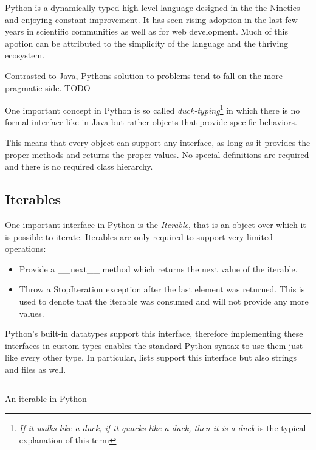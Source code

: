 \documentclass[parskip=half]{scrreprt}
\newcommand\inline[1]{{\addfontfeature{Letters=SmallCaps}#1}}
\begin{document}
Python is a dynamically-typed high level language designed in the the Nineties
and enjoying constant improvement. It has seen rising adoption in the last few
years in scientific communities as well as for web development. Much of this
apotion can be attributed to the simplicity of the language and the thriving
ecosystem.

Contrasted to Java, Pythons solution to problems tend to fall on the more
pragmatic side. TODO

One important concept in Python is so called
\emph{duck-typing}\footnote{\emph{If it walks like a duck, if it quacks like a
duck, then it is a duck} is the typical explanation of this term} in which
there is no formal interface like in Java but rather objects that provide
specific behaviors.

This means that every object can support any interface, as long as it provides
the proper methods and returns the proper values. No special definitions are
required and there is no required class hierarchy.

\subsection{Iterables}
\label{sec:pyiterable}

One important interface in Python is the \emph{Iterable}, that is an object
over which it is possible to iterate. Iterables are only required to support
very limited operations:

\begin{itemize}

  \item Provide a \inline{\_\_next\_\_} method which returns the next value of
	  the iterable.

  \item Throw a \inline{StopIteration} exception after the last element was
	  returned.  This is used to denote that the iterable was consumed and
	  will not provide any more values.

\end{itemize}

Python's built-in datatypes support this interface, therefore implementing
these interfaces in custom types enables the standard Python syntax to use them
just like every other type. In particular, lists support this interface but
also strings and files as well.

\begin{listing}[H]
  \inputminted[linenos]{python}{iterable.py}
  \caption{An iterable in Python}
  \label{lst:pyiterable}
\end{listing}
\end{document}
